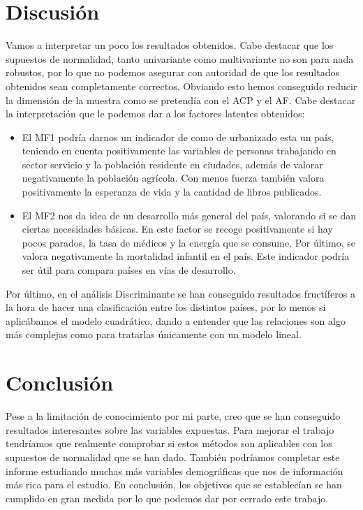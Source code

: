 \section{Discusión}
Vamos a interpretar un poco los resultados obtenidos. Cabe destacar que los supuestos de normalidad, tanto univariante como multivariante no son para nada robustos, por lo que no podemos asegurar con autoridad de que los resultados obtenidos sean completamente correctos.
Obviando esto hemos conseguido reducir la dimensión de la muestra como se pretendía con el ACP y el AF. Cabe destacar la interpretación que le podemos dar a los factores latentes obtenidos:
\begin{itemize}
\item El MF1 podría darnos un indicador de como de urbanizado esta un país, teniendo en cuenta positivamente las variables de personas trabajando en sector servicio y la población residente en ciudades, además de valorar negativamente la población agrícola. Con menos fuerza también valora positivamente la esperanza de vida y la cantidad de libros publicados.
\item El MF2 nos da idea de un desarrollo más general del país, valorando si se dan ciertas necesidades básicas. En este factor se recoge positivamente si hay pocos parados, la tasa de médicos y la energía que se consume. Por último, se valora negativamente la mortalidad infantil en el país. Este indicador podría ser útil para compara países en vías de desarrollo.
\end{itemize}
Por último, en el análisis Discriminante se han conseguido resultados fructíferos a la hora de hacer una clasificación entre los distintos países, por lo menos si aplicábamos el modelo cuadrático, dando a entender que las relaciones son algo más complejas como para tratarlas únicamente con un modelo lineal.

\section{Conclusión}
Pese a la limitación de conocimiento por mi parte, creo que se han conseguido resultados interesantes sobre las variables expuestas. Para mejorar el trabajo tendríamos que realmente comprobar si estos métodos son aplicables con los supuestos de normalidad que se han dado. También podríamos completar este informe estudiando muchas más variables demográficas que nos de información más rica para el estudio.
En conclusión, los objetivos que se establecían se han cumplido en gran medida por lo que podemos dar por cerrado este trabajo.

